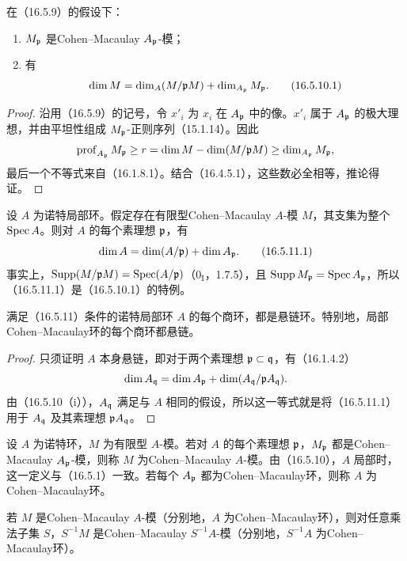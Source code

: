 在（16.5.9）的假设下：
\begin{enumerate}[label=(\roman*)]
 \item $M_{\mathfrak p}$ 是Cohen--Macaulay $A_{\mathfrak p}$-模；
 \item 有
 \begin{equation}
  \dim M=\dim_A(M/\mathfrak p M)+\dim_{A_{\mathfrak p}}M_{\mathfrak p}.
  \tag{16.5.10.1}
 \end{equation}
\end{enumerate}
\begin{proof}
沿用（16.5.9）的记号，令 $x'_i$ 为 $x_i$ 在 $A_{\mathfrak p}$ 中的像。$x'_i$ 属于 $A_{\mathfrak p}$ 的极大理想，并由平坦性组成 $M_{\mathfrak p}$-正则序列（15.1.14）。因此
\[
 \operatorname{prof}_{A_{\mathfrak p}}M_{\mathfrak p}\geq r
 =\dim M-\dim(M/\mathfrak p M)\geq\dim_{A_{\mathfrak p}}M_{\mathfrak p},
\]
最后一个不等式来自（16.1.8.1）。结合（16.4.5.1），这些数必全相等，推论得证。
\end{proof}

设 $A$ 为诺特局部环。假定存在有限型Cohen--Macaulay $A$-模 $M$，其支集为整个 $\operatorname{Spec} A$。则对 $A$ 的每个素理想 $\mathfrak p$，有
\begin{equation}
 \dim A=\dim(A/\mathfrak p)+\dim A_{\mathfrak p}.
 \tag{16.5.11.1}
\end{equation}
事实上，$\operatorname{Supp}(M/\mathfrak p M)=\operatorname{Spec}(A/\mathfrak p)$（$0_{\mathrm I}$，1.7.5），且 $\operatorname{Supp} M_{\mathfrak p}=\operatorname{Spec} A_{\mathfrak p}$，所以（16.5.11.1）是（16.5.10.1）的特例。

满足（16.5.11）条件的诺特局部环 $A$ 的每个商环，都是悬链环。特别地，局部Cohen--Macaulay环的每个商环都悬链。
\begin{proof}
只须证明 $A$ 本身悬链，即对于两个素理想 $\mathfrak p\subset\mathfrak q$，有（16.1.4.2）
\[
 \dim A_{\mathfrak q}=\dim A_{\mathfrak p}+\dim(A_{\mathfrak q}/\mathfrak p A_{\mathfrak q}).
\]
由（16.5.10（i）），$A_{\mathfrak q}$ 满足与 $A$ 相同的假设，所以这一等式就是将（16.5.11.1）用于 $A_{\mathfrak q}$ 及其素理想 $\mathfrak p A_{\mathfrak q}$。
\end{proof}

设 $A$ 为诺特环，$M$ 为有限型 $A$-模。若对 $A$ 的每个素理想 $\mathfrak p$，$M_{\mathfrak p}$ 都是Cohen--Macaulay $A_{\mathfrak p}$-模，则称 $M$ 为Cohen--Macaulay $A$-模。由（16.5.10），$A$ 局部时，这一定义与（16.5.1）一致。若每个 $A_{\mathfrak p}$ 都为Cohen--Macaulay环，则称 $A$ 为Cohen--Macaulay环。

若 $M$ 是Cohen--Macaulay $A$-模（分别地，$A$ 为Cohen--Macaulay环），则对任意乘法子集 $S$，$S^{-1}M$ 是Cohen--Macaulay $S^{-1}A$-模（分别地，$S^{-1}A$ 为Cohen--Macaulay环）。
